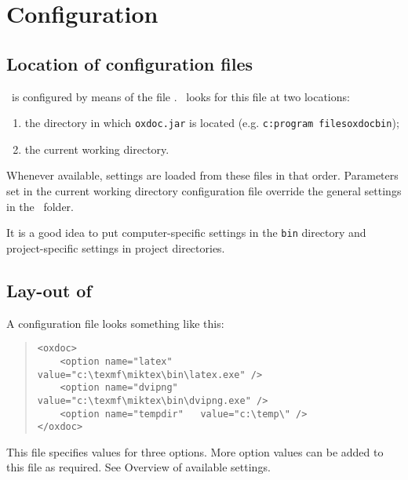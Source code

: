 \newenvironment{options}{\par\noindent\hspace{-6pt}\begin{tabular}{p{1.5in}p{4.95in}}}{\end{tabular}}
\newcommand{\option}[2]{\tt #1 & #2 \medskip \\}


\chapter{Configuration}

\section{Location of configuration files}
\oxdoc~is configured by means of the file \oxdocxml.
\oxdoc~looks for this file at two locations:
\begin{enumerate}
\item the directory in which {\tt oxdoc.jar}
is located (e.g. {\tt c:\bs program files\bs oxdoc\bs bin});
\item the current working directory.
\end{enumerate}

Whenever available, settings are loaded from these files in that order.
Parameters set in the current working directory configuration file override
the general settings in the \oxdoc~folder.

It is a good idea to put computer-specific settings in the {\tt bin}
directory and project-specific settings in project directories. 

\section{Lay-out of \oxdocxml}
A configuration file looks something like this:

\begin{quote}
\small\begin{verbatim}
<oxdoc>
	<option name="latex"     value="c:\texmf\miktex\bin\latex.exe" />
	<option name="dvipng"    value="c:\texmf\miktex\bin\dvipng.exe" />
	<option name="tempdir"   value="c:\temp\" />
</oxdoc>
\end{verbatim}
\end{quote}

This file specifies values for three options. More option values can be added to
this file as required. See Overview of available settings.

